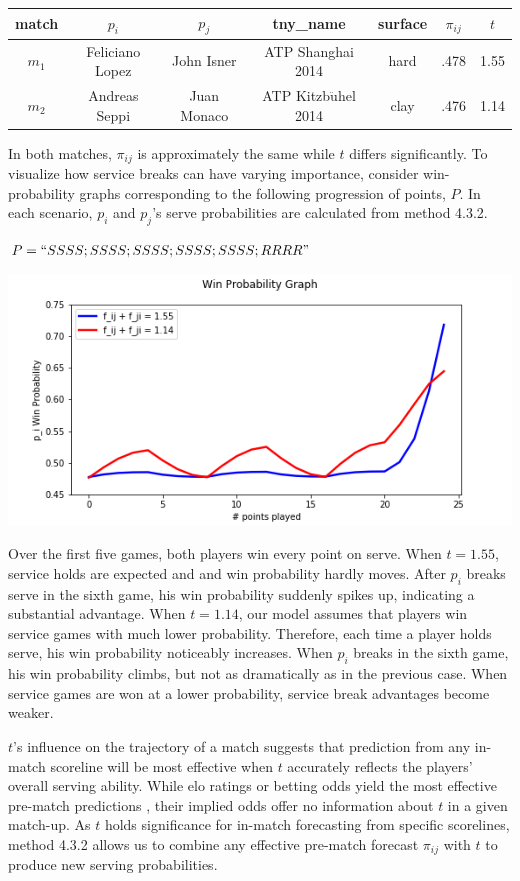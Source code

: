 \documentclass[chapterprefix=false]{report}
\begin{document}
\begin{center}
\begin{tabular}{ |c|c|c|c|c|c|c| } 
 \hline
 match & $p_i$ & $p_j$ & tny\_name & surface
 & $\pi_{ij}$ & $t$ \\ 
 \hline
 $m_1$ & Feliciano Lopez & John Isner & ATP Shanghai 2014 & hard & .478 & 1.55 \\
 \hline
  $m_2$ & Andreas Seppi & Juan Monaco & ATP Kitzb$\ddot{\text{u}}$hel 2014 & clay & .476 & 1.14
 \\
 \hline

\end{tabular}
\end{center}

In both matches, $\pi_{ij}$ is approximately the same while $t$ differs significantly. To visualize how service breaks can have varying importance, consider win-probability graphs corresponding to the following progression of points, $P$. In each scenario, $p_i$ and $p_j$'s serve probabilities are calculated from method 4.3.2.

$P=``SSSS;SSSS;SSSS;SSSS;SSSS;RRRR"$

\includegraphics[scale=.7]{m12_wp}

Over the first five games, both players win every point on serve. When $t=1.55$, service holds are expected and and win probability hardly moves. After $p_i$ breaks serve in the sixth game, his win probability suddenly spikes up, indicating a substantial advantage. When $t=1.14$, our model assumes that players win service games with much lower probability. Therefore, each time a player holds serve, his win probability noticeably increases. When $p_i$ breaks in the sixth game, his win probability climbs, but not as dramatically as in the previous case. When service games are won at a lower probability, service break advantages become weaker.

$t$'s influence on the trajectory of a match suggests that prediction from any in-match scoreline will be most effective when $t$ accurately reflects the players' overall serving ability. While elo ratings or betting odds yield the most effective pre-match predictions \cite{Kovalchik2016}, their implied odds offer no information about $t$ in a given match-up. As $t$ holds significance for in-match forecasting from specific scorelines, method 4.3.2 allows us to combine any effective pre-match forecast $\pi_{ij}$ with $t$ to produce new serving probabilities.
\end{document}

